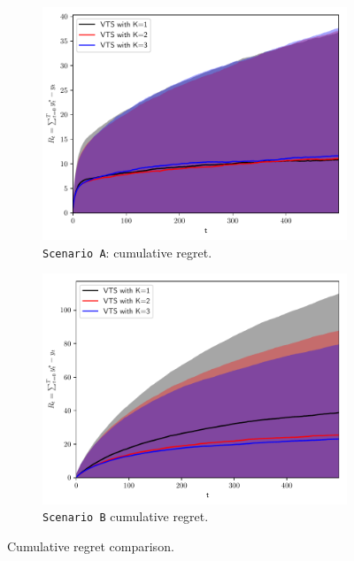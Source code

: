 \documentclass{article}
\begin{document}
\begin{figure}[!h]
	\centering
	\begin{subfigure}[b]{0.49\textwidth}
		\includegraphics[width=\textwidth]{./figs/model_a_cumregret.pdf}
		\caption{\texttt{Scenario A}: cumulative regret.}
		\label{fig:model_a_cumregret}
	\end{subfigure}
	\begin{subfigure}[b]{0.49\textwidth}
		\includegraphics[width=\textwidth]{./figs/model_b_cumregret.pdf}
		\caption{\texttt{Scenario B} cumulative regret.}
		\label{fig:model_b_cumregret}
	\end{subfigure}
	\caption{Cumulative regret comparison.}
	\label{fig:cumregret_comparison}
\end{figure}
\end{document}
